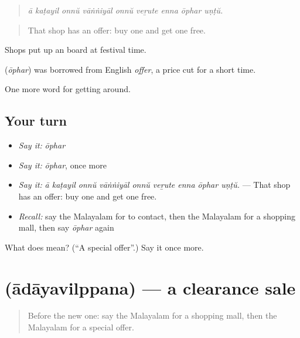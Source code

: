 \begin{quote}
\emph{ā kaṭayil onnŭ vāṅṅiyāl onnŭ veṟute enna ōphar uṇṭŭ.}
\end{quote}

\begin{quote}
That shop has an offer: buy one and get one free.
\end{quote}

Shops put up an  board at festival time.

\begin{cousinweb}
\textbf{} (\emph{ōphar}) was borrowed from English \emph{offer}, a price cut for a short time.
\end{cousinweb}

\begin{grammarlens}[title={What you've built}]
One more word for getting around.
\end{grammarlens}

\subsection*{Your turn}
\begin{itemize}
\raggedright
  \item \emph{Say it:} \emph{ōphar}
  \item \emph{Say it:} \emph{ōphar}, once more
  \item \emph{Say it:} \emph{ā kaṭayil onnŭ vāṅṅiyāl onnŭ veṟute enna ōphar uṇṭŭ.} — That shop has an offer: buy one and get one free.
  \item \emph{Recall:} say the Malayalam for to contact, then the Malayalam for a shopping mall, then say \emph{ōphar} again
\end{itemize}

\begin{tcolorbox}[breakable,colback=teal!4,colframe=teal!35!black,title={Before you move on}]
What does  mean? (\textquotedblleft{}A special offer\textquotedblright{}.) Say it once more.
\end{tcolorbox}
\section[\texorpdfstring{\ml{ആദായവിൽപ്പന} (ādāyavilppana)}{ആദായവിൽപ്പന (ādāyavilppana)}]{ (ādāyavilppana) — a clearance sale}

\label{lesson:ML-C491-adayavilppana}



\begin{quote}
Before the new one: say the Malayalam for a shopping mall, then the Malayalam for a special offer.
\end{quote}

